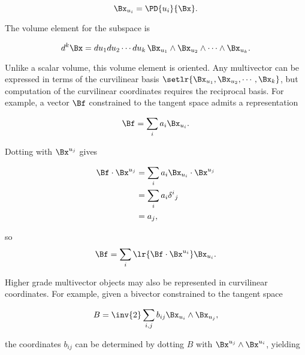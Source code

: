 \begin{equation}\label{eqn:curvilinear:240}
\Bx_{u_i} = \PD{u_i}{\Bx}.
\end{equation}

The volume element for the subspace is

\begin{equation}\label{eqn:curvilinear:260}
d^k \Bx = du_1 du_2 \cdots du_k\,
\Bx_{u_1} \wedge
\Bx_{u_2} \wedge \cdots \wedge
\Bx_{u_k}.
\end{equation}

Unlike a scalar volume, this volume element is oriented.  Any multivector can be expressed in terms of the curvilinear basis \( \setlr{ \Bx_{u_1}, \Bx_{u_2}, \cdots, \Bx_k} \), but computation of the curvilinear coordinates requires the reciprocal basis.  For example, a vector \( \Bf \) constrained to the tangent space admits a representation

\begin{equation}\label{eqn:curvilinear:380}
\Bf = \sum_i a_i \Bx_{u_i}.
\end{equation}

Dotting with \( \Bx^{u_j} \) gives

\begin{equation}\label{eqn:curvilinear:280}
\begin{aligned}
\Bf \cdot \Bx^{u_j}
&= \sum_i a_i \Bx_{u_i} \cdot \Bx^{u_j} \\
&= \sum_i a_i {\delta^i}_j \\
&= a_j,
\end{aligned}
\end{equation}

so
\begin{equation}\label{eqn:curvilinear:300}
\Bf = \sum_i \lr{ \Bf \cdot \Bx^{u_i} } \Bx_{u_i}.
\end{equation}

Higher grade multivector objects may also be represented in curvilinear coordinates.  For example, given a bivector constrained to the tangent space

\begin{equation}\label{eqn:curvilinear:320}
B = \inv{2} \sum_{i, j} b_{ij} \Bx_{u_i} \wedge \Bx_{u_j},
\end{equation}

the coordinates \( b_{ij} \) can be determined by dotting \( B \) with \( \Bx^{u_j} \wedge \Bx^{u_i} \), yielding

